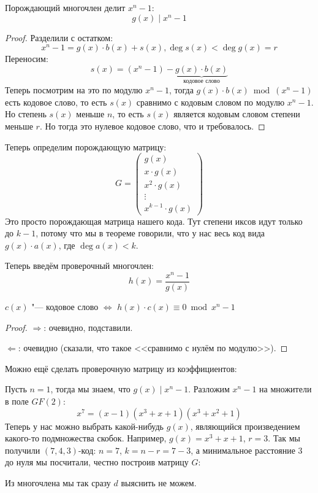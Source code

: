 \begin{theorem}
	Порождающий многочлен делит $x^n-1$:
	\[
	g(x) \mid x^n - 1
	\]
\end{theorem}
\begin{proof}
	Разделили с остатком:
	\[
		x^n - 1 = g(x) \cdot b(x) + s(x), \deg s(x) < \deg g(x) = r
	\]
	Переносим:
	\[
		s(x) = (x^n - 1) - \underbrace{g(x) \cdot b(x)}_\text{кодовое слово}
	\]
	Теперь посмотрим на это по модулю $x^n - 1$, тогда $g(x) \cdot b(x) \bmod (x^n - 1)$
	есть кодовое слово, то есть $s(x)$ сравнимо с кодовым словом по модулю $x^n - 1$.
	Но степень $s(x)$ меньше $n$, то есть $s(x)$ является кодовым словом степени меньше $r$.
	Но тогда это нулевое кодовое слово, что и требовалось.
\end{proof}

Теперь определим порождающую матрицу:
\[
G=\begin{pmatrix}
g(x) \\
x \cdot g(x) \\
x^2 \cdot g(x) \\
\vdots \\
x^{k-1} \cdot g(x)
\end{pmatrix}
\]
Это просто порождающая матрица нашего кода.
Тут степени иксов идут только до $k-1$, потому что мы в теореме \label{cycle_code_all_words} говорили,
что у нас весь код вида $g(x) \cdot a(x)$, где $\deg a(x) < k$.

Теперь введём проверочный многочлен:
\[
	h(x) = \frac{x^n-1}{g(x)}
\]
\begin{theorem}
	$c(x)$ "--- кодовое слово $\iff$ $h(x) \cdot c(x) \equiv 0 \bmod x^n - 1$
\end{theorem}
\begin{proof}
	$\Rightarrow$: очевидно, подставили.

	$\Leftarrow$: очевидно (сказали, что такое <<сравнимо с нулём по модулю>>).
\end{proof}

Можно ещё сделать проверочную матрицу из коэффициентов: \TODO

\begin{Exercise}
	Пусть $n=1$, тогда мы знаем, что $g(x) \mid x^n-1$.
	Разложим $x^n-1$ на множители в поле $GF(2)$:
	\[
		x^7 = (x-1)(x^3+x+1)(x^3+x^2+1)
	\]
	Теперь у нас можно выбрать какой-нибудь $g(x)$, являющийся произведением какого-то подмножества скобок.
	Например, $g(x) = x^3+x+1$, $r=3$.
	Так мы получили $(7, 4, 3)$-код: $n=7$, $k=n-r=7-3$, а минимальное расстояние 3 до нуля мы
	посчитали, честно построив матрицу $G$: \TODO

	Из многочлена мы так сразу $d$ выяснить не можем.
\end{Exercise}
